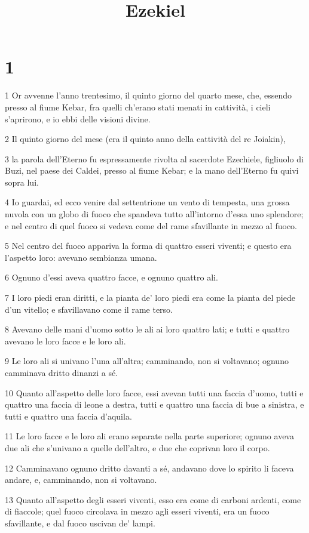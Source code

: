 

\title{Ezekiel}


\chapter{1}

\par 1 Or avvenne l'anno trentesimo, il quinto giorno del quarto mese, che, essendo presso al fiume Kebar, fra quelli ch'erano stati menati in cattività, i cieli s'aprirono, e io ebbi delle visioni divine.
\par 2 Il quinto giorno del mese (era il quinto anno della cattività del re Joiakin),
\par 3 la parola dell'Eterno fu espressamente rivolta al sacerdote Ezechiele, figliuolo di Buzi, nel paese dei Caldei, presso al fiume Kebar; e la mano dell'Eterno fu quivi sopra lui.
\par 4 Io guardai, ed ecco venire dal settentrione un vento di tempesta, una grossa nuvola con un globo di fuoco che spandeva tutto all'intorno d'essa uno splendore; e nel centro di quel fuoco si vedeva come del rame sfavillante in mezzo al fuoco.
\par 5 Nel centro del fuoco appariva la forma di quattro esseri viventi; e questo era l'aspetto loro: avevano sembianza umana.
\par 6 Ognuno d'essi aveva quattro facce, e ognuno quattro ali.
\par 7 I loro piedi eran diritti, e la pianta de' loro piedi era come la pianta del piede d'un vitello; e sfavillavano come il rame terso.
\par 8 Avevano delle mani d'uomo sotto le ali ai loro quattro lati; e tutti e quattro avevano le loro facce e le loro ali.
\par 9 Le loro ali si univano l'una all'altra; camminando, non si voltavano; ognuno camminava dritto dinanzi a sé.
\par 10 Quanto all'aspetto delle loro facce, essi avevan tutti una faccia d'uomo, tutti e quattro una faccia di leone a destra, tutti e quattro una faccia di bue a sinistra, e tutti e quattro una faccia d'aquila.
\par 11 Le loro facce e le loro ali erano separate nella parte superiore; ognuno aveva due ali che s'univano a quelle dell'altro, e due che coprivan loro il corpo.
\par 12 Camminavano ognuno dritto davanti a sé, andavano dove lo spirito li faceva andare, e, camminando, non si voltavano.
\par 13 Quanto all'aspetto degli esseri viventi, esso era come di carboni ardenti, come di fiaccole; quel fuoco circolava in mezzo agli esseri viventi, era un fuoco sfavillante, e dal fuoco uscivan de' lampi.
